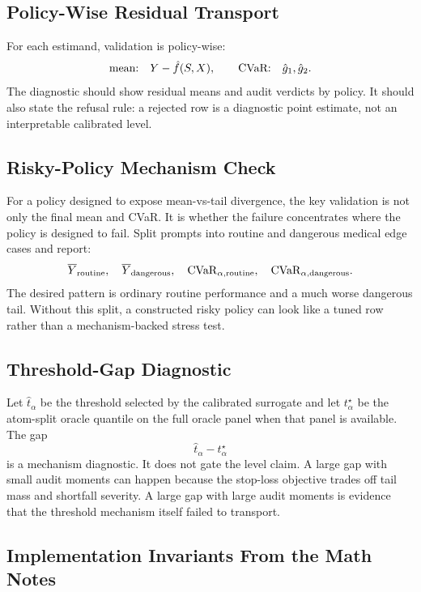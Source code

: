 \subsection{Policy-Wise Residual Transport}

For each estimand, validation is policy-wise:
\[
\text{mean:}\quad Y-\hat f(S,X),
\qquad
\text{CVaR:}\quad
\hat g_1,\hat g_2.
\]
The diagnostic should show residual means and audit verdicts by policy. It
should also state the refusal rule: a rejected row is a diagnostic point
estimate, not an interpretable calibrated level.

\subsection{Risky-Policy Mechanism Check}

For a policy designed to expose mean-vs-tail divergence, the key validation is
not only the final mean and CVaR. It is whether the failure concentrates where
the policy is designed to fail. Split prompts into routine and dangerous
medical edge cases and report:
\[
\overline{Y}_{\mathrm{routine}},
\quad
\overline{Y}_{\mathrm{dangerous}},
\quad
\mathrm{CVaR}_{\alpha,\mathrm{routine}},
\quad
\mathrm{CVaR}_{\alpha,\mathrm{dangerous}}.
\]
The desired pattern is ordinary routine performance and a much worse dangerous
tail. Without this split, a constructed risky policy can look like a tuned row
rather than a mechanism-backed stress test.

\subsection{Threshold-Gap Diagnostic}
\label{app:thresholdgap}

Let $\hat t_\alpha$ be the threshold selected by the calibrated surrogate and
let $t^\star_\alpha$ be the atom-split oracle quantile on the full oracle panel
when that panel is available. The gap
\[
\hat t_\alpha-t^\star_\alpha
\]
is a mechanism diagnostic. It does not gate the level claim. A large gap with
small audit moments can happen because the stop-loss objective trades off tail
mass and shortfall severity. A large gap with large audit moments is evidence
that the threshold mechanism itself failed to transport.

\subsection{Implementation Invariants From the Math Notes}

